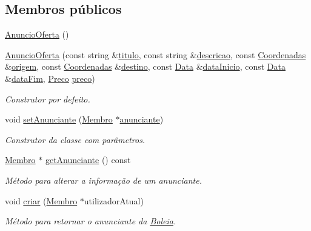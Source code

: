 \subsection*{Membros públicos}
\begin{DoxyCompactItemize}
\item 
\hyperlink{class_anuncio_oferta_a5828e85f76169ec6b3a5b51fabe42d1c}{Anuncio\+Oferta} ()
\item 
\hyperlink{class_anuncio_oferta_a1bc1fd4199b766b00e7234385732720f}{Anuncio\+Oferta} (const string \&\hyperlink{class_anuncio_adb34bedd8220f42b9ee37662c21313e6}{titulo}, const string \&\hyperlink{class_anuncio_aa6a9eb8d08cb06d16061b006eb2c8b97}{descricao}, const \hyperlink{class_coordenadas}{Coordenadas} \&\hyperlink{class_anuncio_a9b3f8ac29ebf2a44e24ea2273064a7f5}{origem}, const \hyperlink{class_coordenadas}{Coordenadas} \&\hyperlink{class_anuncio_acdac86595f84cfb8a2bf54c414857168}{destino}, const \hyperlink{class_data}{Data} \&\hyperlink{class_anuncio_abeb7d8c5fe5e7d127005044981a3cd3d}{data\+Inicio}, const \hyperlink{class_data}{Data} \&\hyperlink{class_anuncio_ac3b9182cc541cb68215f8aa09fb0e11a}{data\+Fim}, \hyperlink{class_preco}{Preco} \hyperlink{class_anuncio_aa780fd8e07586a3af117fd20593fb1b4}{preco})
\begin{DoxyCompactList}\small\item\em Construtor por defeito. \end{DoxyCompactList}\item 
void \hyperlink{class_anuncio_oferta_a2bb132a1679d5a51edf54ac823bb9c4e}{set\+Anunciante} (\hyperlink{class_membro}{Membro} $\ast$\hyperlink{class_anuncio_a58250bfc8ab82d4308839b1e26213a0f}{anunciante})
\begin{DoxyCompactList}\small\item\em Construtor da classe com parâmetros. \end{DoxyCompactList}\item 
\hyperlink{class_membro}{Membro} $\ast$ \hyperlink{class_anuncio_oferta_a517173f7de8f7952e402e58b8b5d19b9}{get\+Anunciante} () const 
\begin{DoxyCompactList}\small\item\em Método para alterar a informação de um anunciante. \end{DoxyCompactList}\item 
void \hyperlink{class_anuncio_oferta_a796d66969f1f391fc62685ad8e6c81cb}{criar} (\hyperlink{class_membro}{Membro} $\ast$utilizador\+Atual)
\begin{DoxyCompactList}\small\item\em Método para retornar o anunciante da \hyperlink{class_boleia}{Boleia}. \end{DoxyCompactList}\item 

\end{DoxyCompactItemize}
